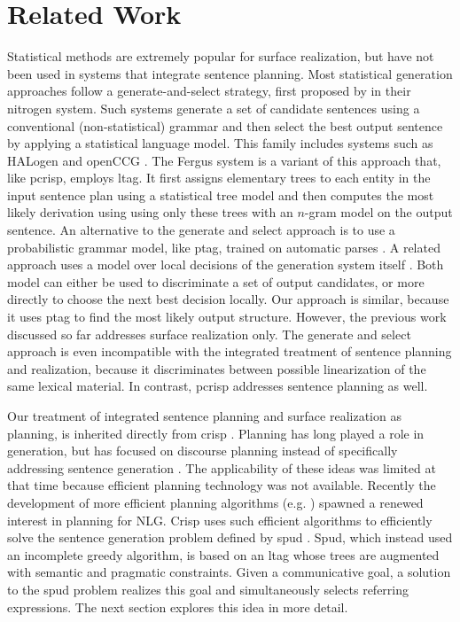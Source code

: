 \section{Related Work}
\label{sec:related}
Statistical methods are extremely popular for surface realization, but have not been used in systems that integrate sentence planning. Most statistical generation approaches follow a generate-and-select strategy, first proposed by  in their {\sc nitrogen} system. Such systems generate a set of candidate sentences using a conventional (non-statistical) grammar and then select the best output sentence by applying a statistical language model. This family includes systems such as {\sc HAL}ogen \cite{langkildeknight1998,langkilde2000} and open{\sc CCG} \cite{whitebaldridge2003}.  The {\sc Fergus} system \cite{bangalorerambow2000} is a variant of this approach that, like {\sc pcrisp}, employs {\sc ltag}. It first assigns elementary trees to each entity in the input sentence plan using a statistical tree model and then computes the most likely derivation using using only these trees with an $n$-gram model on the output sentence. An alternative to the generate and select approach is to use a probabilistic grammar model, like {\sc ptag}, trained on automatic parses \cite{zhongstent2005}. A related approach uses a model over local decisions of the generation system itself \cite{belz2008}. Both model can either be used to discriminate a set of output candidates, or more directly to choose the next best decision locally. Our approach is similar, because it uses {\sc ptag} to find the most likely output structure. However, the previous work discussed so far addresses surface realization only.
The generate and select approach is even incompatible with the integrated treatment of sentence planning and realization, because it discriminates between possible linearization of the same lexical material. In contrast, {\sc pcrisp} addresses sentence planning as well.

Our treatment of integrated sentence planning and surface realization as planning, is inherited directly from {\sc crisp} \cite{kollerstone2007}.  Planning has long played a role in generation, but has focused on discourse planning instead of specifically addressing sentence generation \cite{hovy1988,appelt1992}. The applicability of these ideas was limited at that time because efficient planning technology was not available. Recently the development of more efficient planning algorithms (e.g. ) spawned a renewed interest in planning for NLG.  
{\sc Crisp} uses such efficient algorithms to efficiently solve the sentence generation problem defined by {\sc spud} \cite{stonedoran1997}. {\sc Spud}, which instead used an incomplete greedy algorithm, is based on an {\sc ltag} whose trees are augmented with semantic and pragmatic constraints. Given a communicative goal, a solution to the {\sc spud} problem realizes this goal and simultaneously selects referring expressions. The next section explores this idea in more detail.
